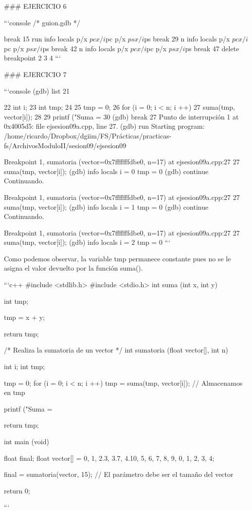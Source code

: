 {{### EJERCICIO 6

```console
  /* guion.gdb */

  break 15
  run
  info locals
  p/x $pc
  x/i $pc
  p/x $ps
  x/i $ps
  break 29
  n
  info locals
  p/x $pc
  x/i $pc
  p/x $ps
  x/i $ps
  break 42
  n
  info locals
  p/x $pc
  x/i $pc
  p/x $ps
  x/i $ps
  break 47
  delete breakpoint 2 3 4
```

### EJERCICIO 7

```console
(gdb) list
21	{
22	   int i;
23	   int tmp;
24	
25	   tmp = 0;
26	   for (i = 0; i < n; i ++)
27	      suma(tmp, vector[i]);
28	
29	   printf ("Suma = %
30	
(gdb) break 27
Punto de interrupción 1 at 0x4005d5: file ejsesion09a.cpp, line 27.
(gdb) run
Starting program: /home/ricardo/Dropbox/dgiim/FS/Prácticas/practicas-fs/ArchivosModuloII/sesion09/ejsesion09 

Breakpoint 1, sumatoria (vector=0x7fffffffdbe0, n=17) at ejsesion09a.cpp:27
27	      suma(tmp, vector[i]);
(gdb) info locals
i = 0
tmp = 0
(gdb) continue
Continuando.

Breakpoint 1, sumatoria (vector=0x7fffffffdbe0, n=17) at ejsesion09a.cpp:27
27	      suma(tmp, vector[i]);
(gdb) info locals
i = 1
tmp = 0
(gdb) continue
Continuando.

Breakpoint 1, sumatoria (vector=0x7fffffffdbe0, n=17) at ejsesion09a.cpp:27
27	      suma(tmp, vector[i]);
(gdb) info locals
i = 2
tmp = 0
```

Como podemos observar, la variable tmp permanece constante pues no se le asigna el valor devuelto por la función suma().

```c++
#include <stdlib.h>
#include <stdio.h>
int suma (int x, int y) {
   int tmp;

   tmp = x + y; 

   return tmp;
}

/* Realiza la sumatoria de un vector */
int sumatoria (float vector[], int n)
{
   int i;
   int tmp;

   tmp = 0;
   for (i = 0; i < n; i ++)
      tmp = suma(tmp, vector[i]); // Almacenamos en tmp

   printf ("Suma = %

   return tmp;
}

int main (void)
{
   float final;
   float vector[] = {0, 1, 2.3, 3.7, 4.10, 5, 6, 7, 8, 9, 0, 1, 2, 3, 4};

   final = sumatoria(vector, 15); // El parámetro debe ser el tamaño del vector

   return 0;
}
```

}}}
